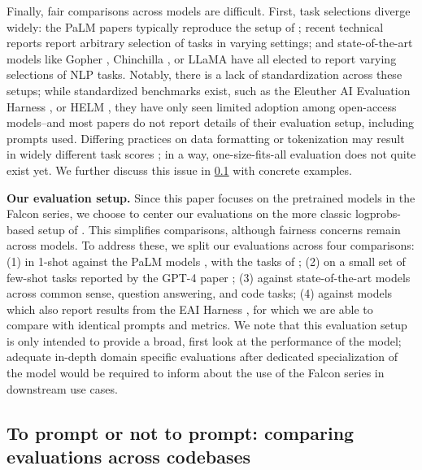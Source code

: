 \documentclass{article}
\begin{document}
Finally, fair comparisons across models are difficult. First, task selections diverge widely: the PaLM papers \citep{palm, palm-2} typically reproduce the setup of \citet{brown2020gpt3}; recent technical reports \citep{gpt-4, inflection-1} report arbitrary selection of tasks in varying settings; and state-of-the-art models like Gopher \citep{gopher}, Chinchilla \citep{hoffmann2022training}, or LLaMA \citep{llama, llama2} have all elected to report varying selections of NLP tasks. Notably, there is a lack of standardization across these setups; while standardized benchmarks exist, such as the Eleuther AI Evaluation Harness \citep{eval-harness}, or HELM \citep{liang2022holistic}, they have only seen limited adoption among open-access models--and most papers do not report details of their evaluation setup, including prompts used. Differing practices on data formatting or tokenization may result in widely different task scores \citep{whatshappening}; in a way, one-size-fits-all evaluation does not quite exist yet. We further discuss this issue in \cref{sec:prompt} with concrete examples.

\textbf{Our evaluation setup.} Since this paper focuses on the pretrained models in the Falcon series, we choose to center our evaluations on the more classic logprobs-based setup of \citet{brown2020gpt3}. This simplifies comparisons, although fairness concerns remain across models. To address these, we split our evaluations across four comparisons: (1) in 1-shot against the PaLM models \citep{palm, palm-2}, with the tasks of \citep{brown2020gpt3}; (2) on a small set of few-shot tasks reported by the GPT-4 paper \citep{gpt-4}; (3) against state-of-the-art models across common sense, question answering, and code tasks; (4) against models which also report results from the EAI Harness \citep{eval-harness}, for which we are able to compare with identical prompts and metrics. We note that this evaluation setup is only intended to provide a broad, first look at the performance of the model; adequate in-depth domain specific evaluations after dedicated specialization of the model would be required to inform about the use of the Falcon series in downstream use cases.

\vspace{-0.1in}
\subsection{To prompt or not to prompt: comparing evaluations across codebases}
\label{sec:prompt}
\end{document}
